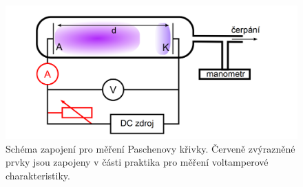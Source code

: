 \documentclass[a4paper,12pt]{article}
\begin{document}
%

\begin{figure}[h!]
	\centering
	\includegraphics[width=145mm]{schema1.png}
	\caption{Schéma zapojení pro měření Paschenovy křivky. Červeně zvýrazněné 
		prvky jsou zapojeny v části praktika pro měření voltamperové 
		charakteristiky.}
	\label{schema1}
\end{figure}
\end{document}
